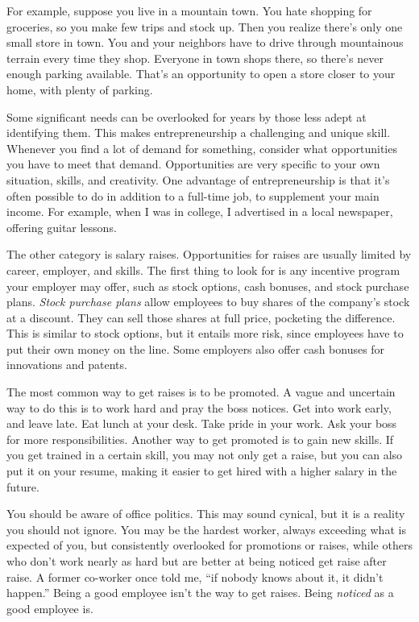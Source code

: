 For example, suppose you live in a mountain town. You hate shopping for groceries, so you make few trips and stock up. Then you realize there's only one small store in town. You and your neighbors have to drive through mountainous terrain every time they shop. Everyone in town shops there, so there's never enough parking available. That's an opportunity to open a store closer to your home, with plenty of parking.

Some significant needs can be overlooked for years by those less adept at identifying them. This makes entrepreneurship a challenging and unique skill. Whenever you find a lot of demand for something, consider what opportunities you have to meet that demand. Opportunities are very specific to your own situation, skills, and creativity. One advantage of entrepreneurship is that it's often possible to do in addition to a full-time job, to supplement your main income. For example, when I was in college, I advertised in a local newspaper, offering guitar lessons.

The other category is salary raises. Opportunities for raises are usually limited by career, employer, and skills. The first thing to look for is any incentive program your employer may offer, such as stock options, cash bonuses, and stock purchase plans. \emph{Stock purchase plans} allow employees to buy shares of the company's stock at a discount. They can sell those shares at full price, pocketing the difference. This is similar to stock options, but it entails more risk, since employees have to put their own money on the line. Some employers also offer cash bonuses for innovations and patents.

The most common way to get raises is to be promoted. A vague and uncertain way to do this is to work hard and pray the boss notices. Get into work early, and leave late. Eat lunch at your desk. Take pride in your work. Ask your boss for more responsibilities. Another way to get promoted is to gain new skills. If you get trained in a certain skill, you may not only get a raise, but you can also put it on your resume, making it easier to get hired with a higher salary in the future.

You should be aware of office politics. This may sound cynical, but it is a reality you should not ignore. You may be the hardest worker, always exceeding what is expected of you, but consistently overlooked for promotions or raises, while others who don't work nearly as hard but are better at being noticed get raise after raise. A former co-worker once told me, “if nobody knows about it, it didn't happen.” Being a good employee isn't the way to get raises. Being \emph{noticed} as a good employee is.


